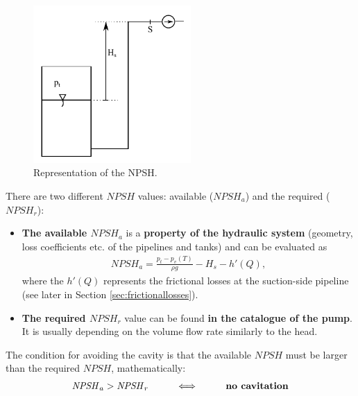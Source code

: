 \begin{figure}[!h]
	\begin{center}
	\centering
	\includegraphics[width=6cm]{figs/NPSH.pdf}
	\caption{\label{fig:NPSH}Representation of the NPSH.}
	\end{center}
\end{figure}

There are two different $\mathit{NPSH}$ values: available ($\mathit{NPSH}_a$) and the required ($\mathit{NPSH}_r$):

\begin{itemize} 
	\item {\bf The available $\mathit{NPSH}_a$} is a {\bf property of the hydraulic system} (geometry, loss coefficients etc. of the pipelines and tanks) and can be evaluated as
\begin{eqnarray}
\mathit{NPSH}_a = \frac{p_t - p_v(T)}{\rho g} - H_s - h'(Q),
\end{eqnarray}
where the $h'(Q)$ represents the frictional losses at the suction-side pipeline (see later in Section \ref{sec:frictionallosses}). 
%
\item {\bf The required $\mathit{NPSH}_r$} value can be found {\bf in the catalogue of the pump}. It is usually depending on the volume flow rate similarly to the head. 
\end{itemize}

The condition for avoiding the cavity is that the available $\mathit{NPSH}$ must be larger than the required $\mathit{NPSH}$, mathematically:
\begin{eqnarray}
\mathit{NPSH}_a > \mathit{NPSH}_r \hspace{1cm} \Longleftrightarrow \hspace{1cm} \text{\textbf{no cavitation}}
\end{eqnarray}



\clearpage
